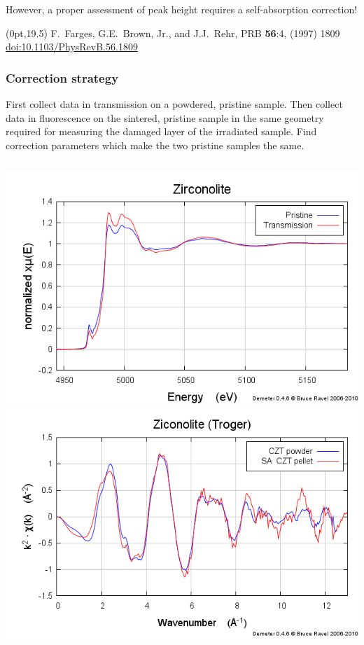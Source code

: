 \documentclass[10pt, xcolor=x11names, compress]{beamer}
\begin{document}
\begin{frame}
  \smallskip

  However, a proper assessment of peak height requires a
  self-absorption correction!

  \begin{textblock*}{0.5\linewidth}(0pt,19.5\TPVertModule)
    \tiny%
    F.~Farges, G.E.~Brown, Jr., and J.J.~Rehr, PRB \textbf{56}:4,
    (1997) 1809
    \href{http://dx.doi.org/10.1103/PhysRevB.56.1809}
    {\color{Blue2}doi:10.1103/PhysRevB.56.1809}
  \end{textblock*}
\end{frame}

\begin{frame}
  \frametitle{Correction strategy}
  \small
  First collect data in transmission on a powdered, pristine sample.
  Then collect data in fluorescence on the sintered, pristine sample
  in the same geometry required for measuring the damaged layer of the
  irradiated sample.  Find correction parameters which make the two
  pristine samples the same.
  \begin{columns}
    \begin{column}{0.5\linewidth}
      \begin{center}
        \includegraphics[width=0.8\linewidth]{images/pristine.png}\\
        \includegraphics[width=0.8\linewidth]{images/zirconolite_chik.png}

\end{center}
\end{column}
\end{columns}
\end{frame}
\end{document}

